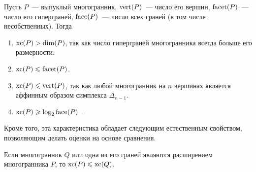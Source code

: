 \begin{property}\label{prop:xc-base}
	Пусть $P$~--- выпуклый многогранник, $\operatorname{vert}(P)$~--- число его вершин, $\operatorname{facet}(P)$~--- число его гиперграней, $\operatorname{face}(P)$~--- число всех граней (в том числе несобственных). Тогда
\begin{enumerate}
	\item $\operatorname{xc}(P) > \dim(P)$, так как число гиперграней многогранника всегда больше его размерности.
	\item $\operatorname{xc}(P) \leqslant \operatorname{facet}(P)$.
	\item $\operatorname{xc}(P) \leqslant \operatorname{vert}(P)$, так как любой многогранник на $n$ вершинах является аффинным образом симплекса $\Delta_{n-1}$.
	\item $\operatorname{xc}(P) \geqslant \log_2 \operatorname{face}(P)$~\cite{Goemans:2015}.
\end{enumerate}
\end{property}

Кроме того, эта характеристика обладает следующим естественным свойством,
позволяющим делать оценки на основе сравнения.

\begin{property}\label{prop:xc-compare}
	Если многогранник $Q$ или одна из его граней являются расширением многогранника $P$, то $\operatorname{xc}(P) \leqslant \operatorname{xc}(Q)$.
\end{property}

